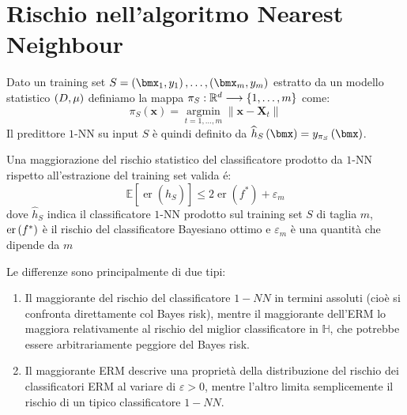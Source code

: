 \documentclass[\main/main.tex]{subfiles}
\begin{document}
\chapter{Rischio nell'algoritmo Nearest Neighbour}
\begin{multicols}{2}
    \begin{definition}[Predittore \(1\)-NN]
        Dato un training set \(S = \examples{m}\) estratto da un modello statistico \(\left(D, \mu\right)\) definiamo la mappa \(\pi_S:\mathbb{R}^d\longrightarrow \left\{1, \ldots, m\right\}\) come:
        \[
            \pi_{S}(\boldsymbol{x})=\underset{t=1, \ldots, m}{\operatorname{argmin}}\left\|\boldsymbol{x}-\boldsymbol{X}_{t}\right\|
        \]
        Il predittore \(1\)-NN su input \(S\) è quindi definito da \(\hat{h}_S\rnd{\bmx} = y_{\pi_S}\rnd{\bmx}\).
    \end{definition}
    \begin{theorem}
        Una maggiorazione del rischio statistico del classificatore prodotto da \(1\)-NN rispetto all'estrazione del training set valida é:
        \[
            \mathbb{E}\left[\operatorname{er}\left(\widehat{h}_{S}\right)\right] \leq 2 \operatorname{er}\left(f^{*}\right)+\varepsilon_{m}
        \]
        dove \(\hat{h}_S\) indica il classificatore \(1\)-NN prodotto sul training set \(S\) di taglia \(m\), \(\text{er}\left(f^*\right)\) è il rischio del classificatore Bayesiano ottimo e \(\varepsilon_m\) è una quantità che dipende da \(m\)
    \end{theorem}
    \begin{observation}
        Le differenze sono principalmente di due tipi:
        \begin{enumerate}
            \item Il maggiorante del rischio del classificatore \(1-NN\) in termini assoluti (cioè si confronta direttamente col Bayes risk), mentre il maggiorante dell'ERM lo maggiora relativamente al rischio del miglior classificatore in \(\mathbb{H}\), che potrebbe essere arbitrariamente peggiore del Bayes risk.
            \item Il maggiorante ERM descrive una proprietà della distribuzione del rischio dei classificatori ERM al variare di \(\varepsilon>0\), mentre l'altro limita semplicemente il rischio di un tipico classificatore \(1-NN\).
        \end{enumerate}
    \end{observation}
\end{multicols}
\clearpage
\end{document}
